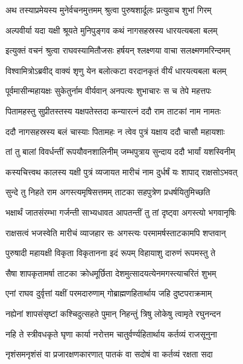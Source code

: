 
\twolineshloka
{अथ तस्याप्रमेयस्य मुनेर्वचनमुत्तमम्}
{श्रुत्वा पुरुषशार्दूलः प्रत्युवाच शुभां गिरम्} %

\twolineshloka
{अल्पवीर्या यदा यक्षी श्रूयते मुनिपुङ्गव}
{कथं नागसहस्रस्य धारयत्यबला बलम्} %

\twolineshloka
{इत्युक्तं वचनं श्रुत्वा राघवस्यामितौजसः}
{हर्षयन् श्लक्ष्णया वाचा सलक्ष्मणमरिन्दमम्} %

\twolineshloka
{विश्वामित्रोऽब्रवीद् वाक्यं शृणु येन बलोत्कटा}
{वरदानकृतं वीर्यं धारयत्यबला बलम्} %

\twolineshloka
{पूर्वमासीन्महायक्षः सुकेतुर्नाम वीर्यवान्}
{अनपत्यः शुभाचारः स च तेपे महत्तपः} %

\twolineshloka
{पितामहस्तु सुप्रीतस्तस्य यक्षपतेस्तदा}
{कन्यारत्नं ददौ राम ताटकां नाम नामतः} %

\twolineshloka
{ददौ नागसहस्रस्य बलं चास्याः पितामहः}
{न त्वेव पुत्रं यक्षाय ददौ चासौ महायशाः} %

\twolineshloka
{तां तु बालां विवर्धन्तीं रूपयौवनशालिनीम्}
{जम्भपुत्राय सुन्दाय ददौ भार्यां यशस्विनीम्} %

\twolineshloka
{कस्यचित्त्वथ कालस्य यक्षी पुत्रं व्यजायत}
{मारीचं नाम दुर्धर्षं यः शापाद् राक्षसोऽभवत्} %

\twolineshloka
{सुन्दे तु निहते राम अगस्त्यमृषिसत्तमम्}
{ताटका सहपुत्रेण प्रधर्षयितुमिच्छति} %

\twolineshloka
{भक्षार्थं जातसंरम्भा गर्जन्ती साभ्यधावत}
{आपतन्तीं तु तां दृष्ट्वा अगस्त्यो भगवानृषिः} %

\twolineshloka
{राक्षसत्वं भजस्वेति मारीचं व्याजहार सः}
{अगस्त्यः परमामर्षस्ताटकामपि शप्तवान्} %

\twolineshloka
{पुरुषादी महायक्षी विकृता विकृतानना}
{इदं रूपम् विहायाशु दारुणं रूपमस्तु ते} %

\twolineshloka
{सैषा शापकृतामर्षा ताटका क्रोधमूर्छिता}
{देशमुत्सादयत्येनमगस्त्याचरितं शुभम्} %

\twolineshloka
{एनां राघव दुर्वृत्तां यक्षीं परमदारुणाम्}
{गोब्राह्मणहितार्थाय जहि दुष्टपराक्रमाम्} %

\twolineshloka
{नह्येनां शापसंसृष्टां कश्चिदुत्सहते पुमान्}
{निहन्तुं त्रिषु लोकेषु त्वामृते रघुनन्दन} %

\twolineshloka
{नहि ते स्त्रीवधकृते घृणा कार्या नरोत्तम}
{चातुर्वर्ण्यहितार्थाय कर्तव्यं राजसूनुना} %

\twolineshloka
{नृशंसमनृशंसं वा प्रजारक्षणकारणात्}
{पातकं वा सदोषं वा कर्तव्यं रक्षता सदा} %

